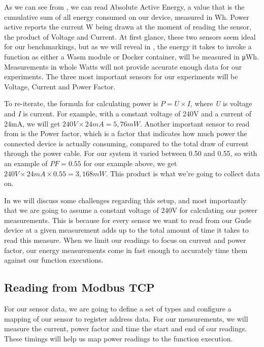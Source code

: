 \documentclass[
  table]{report}
\begin{document}
As we can see from , we can read Absolute Active
Energy, a value that is the cumulative sum of all energy consumed on our
device, measured in Wh. Power active reports the current W being drawn
at the moment of reading the sensor, the product of Voltage and Current.
At first glance, these two sensors seem ideal for our benchmarkings, but
as we will reveal in , the energy it takes to invoke
a function as either a \ac{Wasm} module or Docker container, will be
measured in μWh. Measurements in whole Watts will not provide accurate
enough data for our experiments. The three most important sensors for
our experiments will be Voltage, Current and Power Factor.

To re-iterate, the formula for calculating power is \(P = U \times I\),
where \emph{U} is voltage and \emph{I} is current. For example, with a
constant voltage of 240V and a current of 24mA, we will get
\(240V \times 24mA = 5,76mW\). Another important sensor to read from is
the Power factor, which is a factor that indicates how much power the
connected device is actually consuming, compared to the total draw of
current through the power cable. For our system it varied between 0.50
and 0.55, so with an example of \(PF = 0.55\) for our example above, we
get \(240V \times 24mA \times 0.55 = 3,168mW\). This product is what
we're going to collect data on.

In  we will discuss some challenges
regarding this setup, and most importantly that we are going to assume a
constant voltage of 240V for calculating our power measurements. This is
because for every sensor we want to read from our Gude device at a given
measurement adds up to the total amount of time it takes to read this
measure. When we limit our readings to focus on current and power
factor, our energy measurements come in fast enough to accurately time
them against our function executions.

\subsection{Reading from Modbus TCP}
\label{sect:read_modbus}

For our sensor data, we are going to define a set of types and configure
a mapping of our sensor to register address data. For our measurements,
we will measure the current, power factor and time the start and end of
our readings. These timings will help us map power readings to the
function execution.
\end{document}
